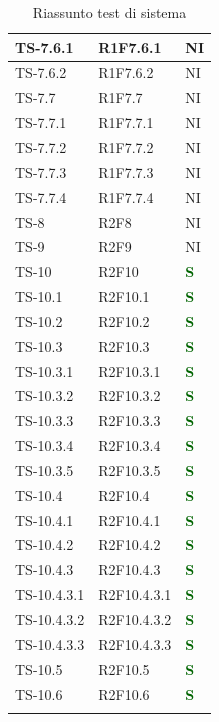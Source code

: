 \begin{longtable}{|C{2.5cm}|C{2.5cm}|C{2.5cm}|}
	\hline
	{TS-7.6.1} & {R1F7.6.1} & {NI}\\
	\hline
	{TS-7.6.2} & {R1F7.6.2} & {NI}\\
	\hline
	{TS-7.7} & {R1F7.7} & {NI}\\
	\hline
	{TS-7.7.1} & {R1F7.7.1} & {NI}\\
	\hline
	{TS-7.7.2} & {R1F7.7.2} & {NI}\\
	\hline
	{TS-7.7.3} & {R1F7.7.3} & {NI}\\
	\hline
	{TS-7.7.4} & {R1F7.7.4} & {NI}\\
	\hline
	{TS-8} & {R2F8} & {NI}\\
	\hline
	{TS-9} & {R2F9} & {NI}\\
	\hline
	{TS-10} & {R2F10} & \textcolor{darkgreen}{\textbf{S}}\\
	\hline
	{TS-10.1} & {R2F10.1} & \textcolor{darkgreen}{\textbf{S}}\\
	\hline
	{TS-10.2} & {R2F10.2} & \textcolor{darkgreen}{\textbf{S}}\\
	\hline
	{TS-10.3} & {R2F10.3} & \textcolor{darkgreen}{\textbf{S}}\\
	\hline
	{TS-10.3.1} & {R2F10.3.1} & \textcolor{darkgreen}{\textbf{S}}\\
	\hline
	{TS-10.3.2} & {R2F10.3.2} & \textcolor{darkgreen}{\textbf{S}}\\
	\hline
	{TS-10.3.3} & {R2F10.3.3} & \textcolor{darkgreen}{\textbf{S}}\\
	\hline
	{TS-10.3.4} & {R2F10.3.4} & \textcolor{darkgreen}{\textbf{S}}\\
	\hline
	{TS-10.3.5} & {R2F10.3.5} & \textcolor{darkgreen}{\textbf{S}}\\
	\hline
	{TS-10.4} & {R2F10.4} & \textcolor{darkgreen}{\textbf{S}}\\
	\hline
	{TS-10.4.1} & {R2F10.4.1} & \textcolor{darkgreen}{\textbf{S}}\\
	\hline
	{TS-10.4.2} & {R2F10.4.2} & \textcolor{darkgreen}{\textbf{S}}\\
	\hline
	{TS-10.4.3} & {R2F10.4.3} & \textcolor{darkgreen}{\textbf{S}}\\
	\hline
	{TS-10.4.3.1} & {R2F10.4.3.1} & \textcolor{darkgreen}{\textbf{S}}\\
	\hline
	{TS-10.4.3.2} & {R2F10.4.3.2} & \textcolor{darkgreen}{\textbf{S}}\\
	\hline
	{TS-10.4.3.3} & {R2F10.4.3.3} & \textcolor{darkgreen}{\textbf{S}}\\
	\hline
	{TS-10.5} & {R2F10.5} & \textcolor{darkgreen}{\textbf{S}}\\
	\hline
	{TS-10.6} & {R2F10.6} & \textcolor{darkgreen}{\textbf{S}}\\
	\hline
	\caption{Riassunto test di sistema}
	\label{tabella:riassunto TS}
\end{longtable}
